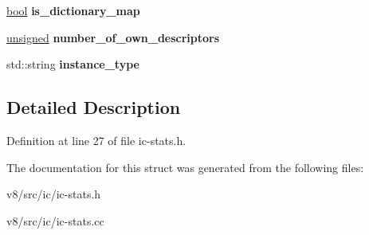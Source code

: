 \begin{DoxyCompactItemize}
\item 
\mbox{\label{structv8_1_1internal_1_1ICInfo_aea35f9f6887cddd0b08c33a0fdc7afbf}} 
\mbox{\hyperlink{classbool}{bool}} {\bfseries is\+\_\+dictionary\+\_\+map}
\item 
\mbox{\label{structv8_1_1internal_1_1ICInfo_a873d58bdd03a514315206aff0e6272f6}} 
\mbox{\hyperlink{classunsigned}{unsigned}} {\bfseries number\+\_\+of\+\_\+own\+\_\+descriptors}
\item 
\mbox{\label{structv8_1_1internal_1_1ICInfo_aac0bd78ad839deaa021c18a832407700}} 
std\+::string {\bfseries instance\+\_\+type}
\end{DoxyCompactItemize}


\subsection{Detailed Description}


Definition at line 27 of file ic-\/stats.\+h.



The documentation for this struct was generated from the following files\+:\begin{DoxyCompactItemize}
\item 
v8/src/ic/ic-\/stats.\+h\item 
v8/src/ic/ic-\/stats.\+cc\end{DoxyCompactItemize}
